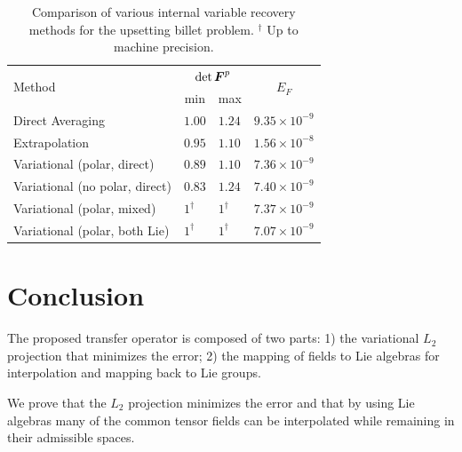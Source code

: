 \documentclass[12pt]{article}
\begin{document}
\begin{table}[htbp]
  \begin{center}
    \begin{tabular}{ l l l l }
      \toprule
      \multirow{2}{*}{Method}
      &
      \multicolumn{2}{c}{$\det {\boldsymbol{F}}^{p}$}
      & 
      \multicolumn{1}{c}{\multirow{2}{*}{$E_{F}$}}
      \\
      &
      \multicolumn{1}{c}{min}
      &
      \multicolumn{1}{c}{max}
      &
      \\
      \hline
      Direct Averaging
      &
      $1.00$
      & 
      $1.24$
      & 
      $9.35 \times 10^{-9}$
      \\
      Extrapolation   
      &
      $0.95$
      &
      $1.10$
      &
      $1.56 \times 10^{-8}$
      \\
      Variational (polar, direct)
      &
      $0.89$
      & 
      $1.10$
      & 
      $7.36 \times 10^{-9}$
      \\
      Variational (no polar, direct)
      &
      $0.83$
      & 
      $1.24$
      & 
      $7.40 \times 10^{-9}$
      \\
      Variational (polar, mixed)  
      &
      $1^\dagger$
      & 
      $1^\dagger$
      & 
      $7.37 \times 10^{-9}$
      \\
      Variational (polar, both Lie)  
      &
      $1^\dagger$
      & 
      $1^\dagger$
      & 
      $7.07 \times 10^{-9}$
      \\
      \bottomrule
    \end{tabular}
    \caption{Comparison of various internal variable recovery methods
      for the upsetting billet problem. $^\dagger$ Up to machine precision.}
    \label{tab:billet-error-comparison}
  \end{center}
\end{table}

\section{Conclusion}

The proposed transfer operator is composed of two parts: 1) the variational
$L_2$ projection that minimizes the error; 2) the mapping of fields to Lie
algebras for interpolation and mapping back to Lie groups.

We prove that the $L_2$ projection minimizes the error and that by using Lie
algebras many of the common tensor fields can be interpolated while remaining in
their admissible spaces.
\end{document}
